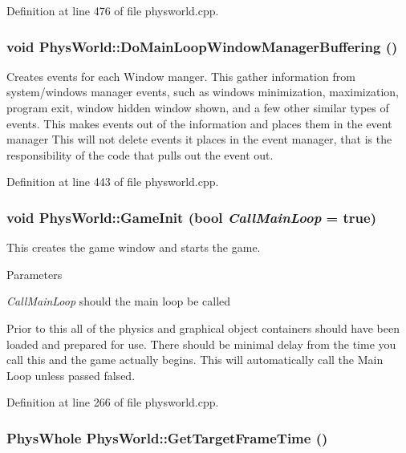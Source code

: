 Definition at line 476 of file physworld.cpp.\hypertarget{classPhysWorld_ae81bab7f314d98f7b787c508e60c9c9a}{
\subsubsection[{DoMainLoopWindowManagerBuffering}]{\setlength{\rightskip}{0pt plus 5cm}void PhysWorld::DoMainLoopWindowManagerBuffering ()}}
\label{db/df5/classPhysWorld_ae81bab7f314d98f7b787c508e60c9c9a}


Creates events for each Window manger. This gather information from system/windows manager events, such as windows minimization, maximization, program exit, window hidden window shown, and a few other similar types of events. This makes events out of the information and places them in the event manager This will not delete events it places in the event manager, that is the responsibility of the code that pulls out the event out. 

Definition at line 443 of file physworld.cpp.\hypertarget{classPhysWorld_afc5116f97cc1e91e899d1a1ca7e14e9b}{
\subsubsection[{GameInit}]{\setlength{\rightskip}{0pt plus 5cm}void PhysWorld::GameInit (bool {\em CallMainLoop} = {\ttfamily true})}}
\label{db/df5/classPhysWorld_afc5116f97cc1e91e899d1a1ca7e14e9b}


This creates the game window and starts the game. 
\begin{DoxyParams}{Parameters}
\item[{\em CallMainLoop}]should the main loop be called\end{DoxyParams}
Prior to this all of the physics and graphical object containers should have been loaded and prepared for use. There should be minimal delay from the time you call this and the game actually begins. This will automatically call the Main Loop unless passed falsed. 

Definition at line 266 of file physworld.cpp.\hypertarget{classPhysWorld_a33e8430ed43897276ca55fbb47e54bcf}{
\subsubsection[{GetTargetFrameTime}]{\setlength{\rightskip}{0pt plus 5cm}PhysWhole PhysWorld::GetTargetFrameTime ()}}
\label{db/df5/classPhysWorld_a33e8430ed43897276ca55fbb47e54bcf}


